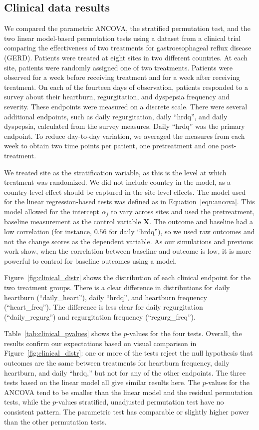 \documentclass[12pt]{article}
\begin{document}
\subsection{Clinical data results}
We compared the parametric ANCOVA, the stratified permutation test, and the two linear model-based permutation tests using a dataset from a clinical trial comparing the effectiveness of two treatments for gastroesophageal reflux disease (GERD).
Patients were treated at eight sites in two different countries.
At each site, patients were randomly assigned one of two treatments.
Patients were observed for a week before receiving treatment and for a week after receiving treatment.
On each of the fourteen days of observation, patients responded to a survey about their heartburn, regurgitation, and dyspepsia frequency and severity.
These endpoints were measured on a discrete scale.
There were several additional endpoints, such as daily regurgitation, daily ``hrdq'', and daily dyspepsia, calculated from the survey measures.
Daily ``hrdq'' was the primary endpoint.
To reduce day-to-day variation, we averaged the measures from each week to obtain two time points per patient, one pretreatment and one post-treatment.

We treated site as the stratification variable, as this is the level at which treatment was randomized.
We did not include country in the model, as a country-level effect should be captured in the site-level effects.
The model used for the linear regression-based tests was defined as in Equation~\ref{eqn:ancova}.
This model allowed for the intercept $\alpha_j$ to vary across sites and used the pretreatment, baseline measurement as the control variable $\mathbf{X}$.
The outcome and baseline had a low correlation (for instance, $0.56$ for daily ``hrdq''), so we used raw outcomes and not the change scores as the dependent variable. 
As our simulations and previous work \cite{frison_repeated_1992} show, when the correlation between baseline and outcome is low, it is more powerful to control for baseline outcomes using a model.

Figure~\ref{fig:clinical_distr} shows the distribution of each clinical endpoint for the two treatment groups.
There is a clear difference in distributions for daily heartburn (``daily\_heart''), daily ``hrdq'', and heartburn frequency (``heart\_freq'').
The difference is less clear for daily regurgitation (``daily\_regurg'') and regurgitation frequency (``regurg\_freq'').

Table~\ref{tab:clinical_pvalues} shows the $p$-values for the four tests.
Overall, the results confirm our expectations based on visual comparison in Figure~\ref{fig:clinical_distr}:
one or more of the tests reject the null hypothesis that outcomes are the same between treatments for heartburn frequency, daily heartburn, and daily ``hrdq,''
but not for any of the other endpoints.
The three tests based on the linear model all give similar results here.
The $p$-values for the ANCOVA tend to be smaller than the linear model and the residual permutation tests, while the $p$-values stratified, unadjusted permutation test have no consistent pattern.
The parametric test has comparable or slightly higher power than the other permutation tests.
\end{document}
